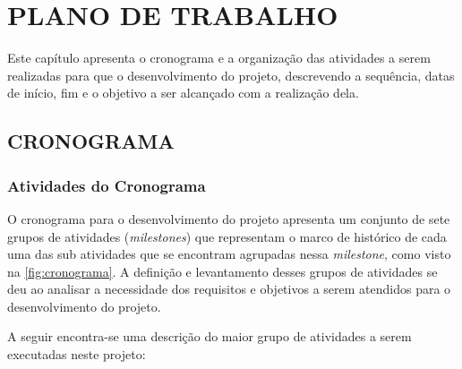 
\chapter{PLANO DE TRABALHO}
\label{chap:planoDeTrabalho}

Este capítulo apresenta o cronograma e a organização das atividades a serem realizadas para que o desenvolvimento do projeto, descrevendo a sequência, datas de início, fim e o objetivo a ser alcançado com a realização dela.

\section{CRONOGRAMA}

\subsection{Atividades do Cronograma}

O cronograma para o desenvolvimento do projeto apresenta um conjunto de sete grupos de atividades (\textit{milestones}) que representam o marco de histórico de cada uma das sub atividades que se encontram agrupadas nessa \textit{milestone}, como visto na \autoref{fig:cronograma}. A definição e levantamento desses grupos de atividades se deu ao analisar a necessidade dos requisitos e objetivos a serem atendidos para o desenvolvimento do projeto.

A seguir encontra-se uma descrição do maior grupo de atividades a serem executadas neste projeto:

